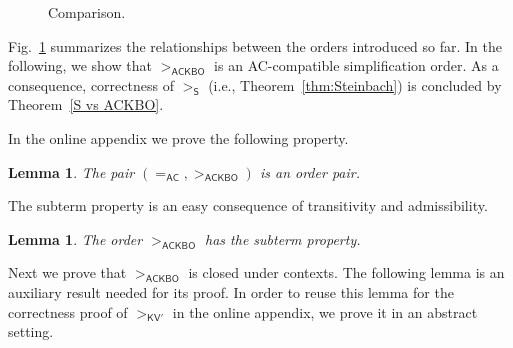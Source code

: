 \documentclass{tlp}
\newcommand{\qed}{\hspace*{1em}\hbox{\proofbox}}
\newtheorem{lemma}[theorem]{Lemma}
\newcommand{\m}[1]{\mathsf{#1}}
\newcommand{\mc}[1]{\mathcal{#1}}
\newcommand{\mr}[1]{\mathrm{#1}}
\newcommand{\AC}{\mr{\m{AC}}}
\newcommand{\ackbo}{\mr{\m{ACKBO}}}
\newcommand{\steinbach}{\mr{\m{S}}}
\newcommand{\KVC}{\mr{\m{KV'}}}
\newcommand{\RR}{\mc{R}}
\begin{document}
\begin{figure}[tb]
\centering
{}
\caption{Comparison.}
\label{comparison}
\end{figure}
Fig.~\ref{comparison} summarizes the relationships between the orders
introduced so far.
In the following, we show that $>_\ackbo$ is an AC-compatible 
simplification order.
As a consequence, correctness of $>_\steinbach$
(i.e., Theorem~\ref{thm:Steinbach}) is concluded by
Theorem~\ref{S vs ACKBO}.

In the online appendix we prove the following property.
\begin{lemma}
\label{lem:ackbo order pair}
The pair $({=_\AC},{>_\ackbo})$ is an order pair.
\end{lemma}

The subterm property is an easy consequence of transitivity and
admissibility.

\begin{lemma}
\label{lem:subterm}
The order $>_\ackbo$ has the subterm property.
\qed
\end{lemma}

Next we prove that $>_\ackbo$ is closed under contexts.
The following lemma is an auxiliary result needed for its proof.
In order to reuse this lemma for the correctness proof of $>_\KVC$
in the online appendix,
we prove it in an abstract setting.
\end{document}
